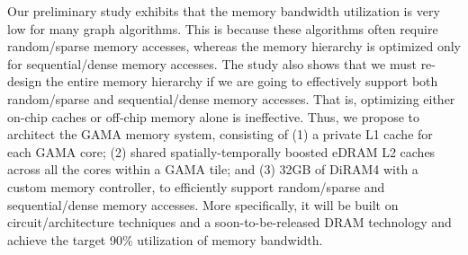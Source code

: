 



\noindent
Our preliminary study exhibits that the memory bandwidth utilization is very low for many graph algorithms.
This is because these algorithms often require random/sparse memory accesses, whereas the memory hierarchy is optimized only for sequential/dense memory accesses.
The study also shows that we must re-design the entire memory hierarchy if we are going to effectively support both random/sparse and sequential/dense memory accesses.
That is, optimizing either on-chip caches or off-chip memory alone is ineffective.
Thus, we propose to architect the GAMA memory system, consisting of (1) a private L1 cache for each GAMA core; (2) shared spatially-temporally boosted eDRAM L2 caches across all the cores within a GAMA tile; and (3) 32GB of DiRAM4 with a custom memory controller, to efficiently support random/sparse and sequential/dense memory accesses.
More specifically, it will be built on circuit/architecture techniques and a soon-to-be-released DRAM technology and achieve the target 90\% utilization of memory bandwidth. 


